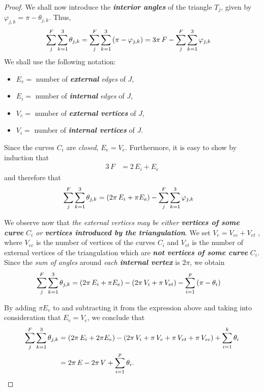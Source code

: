 \documentclass[11pt]{article}
\begin{document}
\begin{itemize}
\begin{proof}
We shall now introduce the \textbf{\emph{interior angles}} of the triangle $T_j$, given by $\varphi_{j,k} = \pi - \theta_{j,k}$. Thus,
\begin{align*}
\sum_{j}^{F}\sum_{k=1}^{3}\theta_{j,k} &=  \sum_{j}^{F}\sum_{k=1}^{3}\left(\pi  - \varphi_{j,k}\right) = 3\pi\,F -  \sum_{j}^{F}\sum_{k=1}^{3}\varphi_{j,k}
\end{align*}
We shall use the following notation:
\begin{itemize}
\item $E_e =$ number of \emph{\textbf{external} edges} of $J$,
\item $E_i =$ number of \emph{\textbf{internal} edges} of $J$,
\item $V_e =$ number of \emph{\textbf{external vertices}} of $J$,
\item $V_i =$ number of \emph{\textbf{internal vertices}} of $J$.
\end{itemize}
Since the curves $C_i$ are \emph{closed}, $E_e = V_e$. Furthermore, it is easy to show by induction that
\begin{align*}
3\,F &= 2\,E_i + E_e
\end{align*}
and therefore that
\begin{align*}
\sum_{j}^{F}\sum_{k=1}^{3}\theta_{j,k} &=  \left(2\pi\, E_i + \pi E_e\right) -  \sum_{j}^{F}\sum_{k=1}^{3}\varphi_{j,k}
\end{align*}

We observe now that \emph{the external vertices may be either \textbf{vertices of some curve} $C_i$ or \textbf{vertices introduced by the triangulation}}. We set $V_e = V_{ec} + V_{et}$ , where $V_{ec}$ is the number of vertices of the curves $C_i$ and $V_{et}$ is the number of external vertices of the triangulation which are \emph{\textbf{not vertices of some curve}} $C_i$. Since the \emph{sum of angles} around \emph{each \textbf{internal vertex}} is $2\pi$, we obtain
\begin{align*}
\sum_{j}^{F}\sum_{k=1}^{3}\theta_{j,k} &=  \left(2\pi\, E_i + \pi E_e\right) - \left(2\pi\,V_{i} + \pi\,V_{et}\right) -  \sum_{i=1}^{p}\left(\pi - \theta_{i}\right)
\end{align*}

By adding $\pi E_e$ to and subtracting it from the expression above and taking into consideration that $E_e = V_e$, we conclude that
\begin{align*}
\sum_{j}^{F}\sum_{k=1}^{3}\theta_{j,k} &=  \left(2\pi\, E_i + 2\pi E_e\right) - \left(2\pi\,V_{i} + \pi\,V_e +  \pi\,V_{et} + \pi\,V_{ec}\right) + \sum_{i=1}^{k}\theta_{i}\\
&= 2\pi\,E - 2\pi\,V + \sum_{i=1}^{p}\theta_{i}.
\end{align*}


\end{proof}
\end{itemize}
\end{document}
